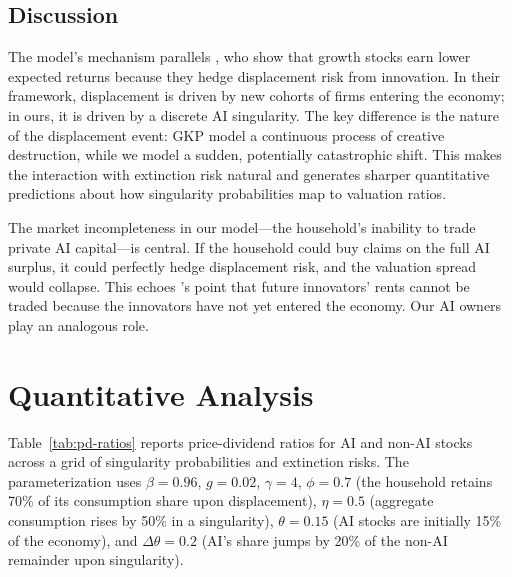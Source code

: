 \documentclass[12pt]{article}
\begin{document}
\subsection{Discussion} %

The model's mechanism parallels \citet{GKP2012}, who show that growth stocks earn lower expected returns because they hedge displacement risk from innovation. In their framework, displacement is driven by new cohorts of firms entering the economy; in ours, it is driven by a discrete AI singularity. The key difference is the nature of the displacement event: GKP model a continuous process of creative destruction, while we model a sudden, potentially catastrophic shift. This makes the interaction with extinction risk \citep{Jones2024} natural and generates sharper quantitative predictions about how singularity probabilities map to valuation ratios.

The market incompleteness in our model---the household's inability to trade private AI capital---is central. If the household could buy claims on the full AI surplus, it could perfectly hedge displacement risk, and the valuation spread would collapse. This echoes \citet{GKP2012}'s point that future innovators' rents cannot be traded because the innovators have not yet entered the economy. Our AI owners play an analogous role.

\section{Quantitative Analysis} %

Table~\ref{tab:pd-ratios} reports price-dividend ratios for AI and non-AI stocks across a grid of singularity probabilities and extinction risks. The parameterization uses $\beta = 0.96$, $g = 0.02$, $\gamma = 4$, $\phi = 0.7$ (the household retains 70\% of its consumption share upon displacement), $\eta = 0.5$ (aggregate consumption rises by 50\% in a singularity), $\theta = 0.15$ (AI stocks are initially 15\% of the economy), and $\Delta\theta = 0.2$ (AI's share jumps by 20\% of the non-AI remainder upon singularity).

\begin{table}[H]
\centering
\caption{Price-Dividend Ratios: AI Stocks vs.\ Non-AI Stocks}
\label{tab:pd-ratios} %

\end{table}
\end{document}

